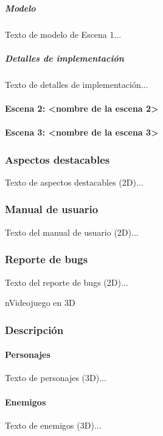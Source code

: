 \documentclass[12pt,a4paper,twoside,spanish]{article}      %
\begin{document}
\subparagraph{Modelo}
Texto de modelo de Escena 1...

\subparagraph{Detalles de implementación}
Texto de detalles de implementación...

\paragraph{Escena 2: <nombre de la escena 2>}


\paragraph{Escena 3: <nombre de la escena 3>}


\subsubsection{Aspectos destacables}
Texto de aspectos destacables (2D)...

\subsubsection{Manual de usuario}
Texto del manual de usuario (2D)...

\subsubsection{Reporte de bugs}
Texto del reporte de bugs (2D)...

\clearpage

n{Videojuego en 3D}

\subsubsection{Descripción}
\paragraph{Personajes}
Texto de personajes (3D)...

\paragraph{Enemigos}
Texto de enemigos (3D)...
\end{document}
